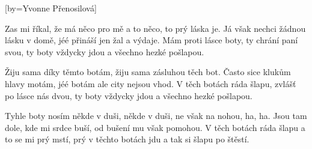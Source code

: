 [by={Yvonne Přenosilová}]

\beginverse{}
Zas mi říkal, že má něco pro mě a to něco, to prý láska je.
Já však nechci žádnou lásku v domě, jéé
přináší jen žal a výdaje.
Mám proti lásce boty, ty chrání paní svou,
ty boty vždycky jdou a všechno hezké pošlapou.
\endverse{}

\beginverse{}
Žiju sama díky těmto botám, žiju sama zásluhou těch bot.
Často sice klukům hlavy motám, jéé
botám ale city nejsou vhod.
V těch botách ráda šlapu, zvlášť po lásce nás dvou,
ty boty vždycky jdou a všechno hezké pošlapou.
\endverse{}

\beginverse{}
Tyhle boty nosím někde v duši, někde v duši, ne však na nohou, ha, ha.
Jsou tam dole, kde mi srdce buší,
od bušení mu však pomohou.
V těch botách ráda šlapu a to se mi prý mstí,
prý v těchto botách jdu a tak si šlapu po štěstí.
\endverse{}

\endsong{}
